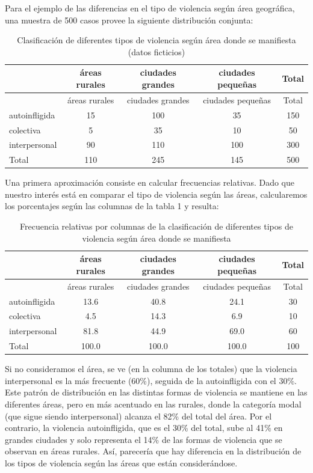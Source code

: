 \documentclass[]{book}
\begin{document}
Para el ejemplo de las diferencias en el tipo de violencia según área
geográfica, una muestra de 500 casos provee la siguiente distribución
conjunta:

\begin{longtable}[]{@{}lcccc@{}}
\caption{\label{tab:frecObs}Clasificación de diferentes tipos de violencia según área donde se manifiesta (datos ficticios)}\tabularnewline
\toprule
& áreas rurales & ciudades grandes & ciudades pequeñas & Total\tabularnewline
\midrule
\endfirsthead
\toprule
& áreas rurales & ciudades grandes & ciudades pequeñas & Total\tabularnewline
\midrule
\endhead
autoinfligida & 15 & 100 & 35 & 150\tabularnewline
colectiva & 5 & 35 & 10 & 50\tabularnewline
interpersonal & 90 & 110 & 100 & 300\tabularnewline
Total & 110 & 245 & 145 & 500\tabularnewline
\bottomrule
\end{longtable}

Una primera aproximación consiste en calcular frecuencias relativas.
Dado que nuestro interés está en comparar el tipo de violencia según las
áreas, calcularemos los porcentajes según las columnas de la tabla 1 y
resulta:

\begin{longtable}[]{@{}lcccc@{}}
\caption{\label{tab:unnamed-chunk-156}Frecuencia relativas por columnas de la clasificación de diferentes tipos de violencia según área donde se manifiesta}\tabularnewline
\toprule
& áreas rurales & ciudades grandes & ciudades pequeñas & Total\tabularnewline
\midrule
\endfirsthead
\toprule
& áreas rurales & ciudades grandes & ciudades pequeñas & Total\tabularnewline
\midrule
\endhead
autoinfligida & 13.6 & 40.8 & 24.1 & 30\tabularnewline
colectiva & 4.5 & 14.3 & 6.9 & 10\tabularnewline
interpersonal & 81.8 & 44.9 & 69.0 & 60\tabularnewline
Total & 100.0 & 100.0 & 100.0 & 100\tabularnewline
\bottomrule
\end{longtable}

Si no consideramos el área, se ve (en la columna de los totales) que la
violencia interpersonal es la más frecuente (60\%), seguida de la
autoinfligida con el 30\%. Este patrón de distribución en las distintas
formas de violencia se mantiene en las diferentes áreas, pero en más
acentuado en las rurales, donde la categoría modal (que sigue siendo
interpersonal) alcanza el 82\% del total del área. Por el contrario, la
violencia autoinfligida, que es el 30\% del total, sube al 41\% en grandes
ciudades y solo representa el 14\% de las formas de violencia que se
observan en áreas rurales. Así, parecería que hay diferencia en la
distribución de los tipos de violencia según las áreas que están
considerándose.
\end{document}
